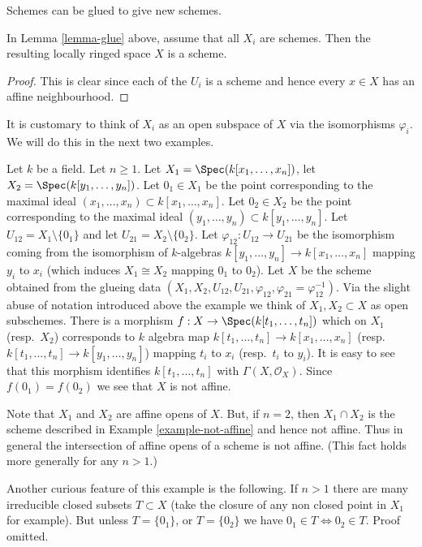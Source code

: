 \begin{lemma}
\label{lemma-glue-schemes}
\begin{slogan}
Schemes can be glued to give new schemes.
\end{slogan}
In Lemma \ref{lemma-glue} above, assume that all
$X_i$ are schemes. Then the resulting locally ringed
space $X$ is a scheme.
\end{lemma}

\begin{proof}
This is clear since each of the $U_i$ is a scheme
and hence every $x \in X$ has an affine neighbourhood.
\end{proof}

\noindent
It is customary to think of $X_i$ as an open subspace of
$X$ via the isomorphisms $\varphi_i$. We will do this in
the next two examples.

\begin{example}
\label{example-affine-space-zero-doubled}
Let $k$ be a field. Let $n \geq 1$.
Let $X_1 = \Spec(k[x_1, \ldots, x_n])$,
let $X_2 = \Spec(k[y_1, \ldots, y_n])$.
Let $0_1 \in X_1$ be the point corresponding to the maximal ideal
$(x_1, \ldots, x_n) \subset k[x_1, \ldots, x_n]$.
Let $0_2 \in X_2$ be the point corresponding to the maximal ideal
$(y_1, \ldots, y_n) \subset k[y_1, \ldots, y_n]$.
Let $U_{12} = X_1 \setminus \{0_1\}$ and
let $U_{21} = X_2 \setminus \{0_2\}$. Let
$\varphi_{12} : U_{12} \to U_{21}$ be the isomorphism
coming from the isomorphism of $k$-algebras
$k[y_1, \ldots, y_n] \to k[x_1, \ldots, x_n]$
mapping $y_i$ to $x_i$ (which induces $X_1 \cong X_2$ mapping
$0_1$ to $0_2$).
Let $X$ be the scheme obtained from the glueing data
$(X_1, X_2, U_{12}, U_{21}, \varphi_{12},
\varphi_{21} = \varphi_{12}^{-1})$. Via the slight abuse
of notation introduced above the example we think of
$X_1, X_2 \subset X$ as open subschemes.
There is a morphism $f : X \to \Spec(k[t_1, \ldots, t_n])$
which on $X_1$ (resp.\ $X_2$) corresponds to $k$ algebra map
$k[t_1, \ldots, t_n] \to k[x_1, \ldots, x_n]$
(resp.\ $k[t_1, \ldots, t_n] \to k[y_1, \ldots, y_n]$)
mapping $t_i$ to $x_i$ (resp.\  $t_i$ to $y_i$).
It is easy to see that this morphism identifies
$k[t_1, \ldots, t_n]$ with $\Gamma(X, \mathcal{O}_X)$. Since
$f(0_1) = f(0_2)$ we see that $X$ is not affine.

\medskip\noindent
Note that $X_1$ and $X_2$ are affine opens of $X$.
But, if $n = 2$, then $X_1 \cap X_2$ is the scheme
described in Example \ref{example-not-affine} and hence not affine.
Thus in general the intersection of affine opens of a scheme
is not affine. (This fact holds more generally for any $n > 1$.)

\medskip\noindent
Another curious feature of this example is the following.
If $n > 1$ there are many irreducible closed subsets $T \subset X$
(take the closure of any non closed point in $X_1$ for example).
But unless $T = \{0_1\}$, or $T = \{0_2\}$ we have
$0_1 \in T \Leftrightarrow 0_2 \in T$. Proof omitted.
\end{example}


